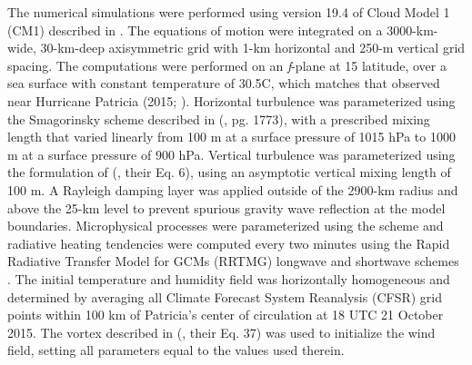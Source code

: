 \documentclass{ametsoc}
\begin{document}
The numerical simulations were performed using version 19.4 of Cloud Model 1 (CM1) described in \cite{BryanRotunno2009}.
The equations of motion were integrated on a 3000-km-wide, 30-km-deep axisymmetric grid with 1-km horizontal and 250-m vertical grid spacing.
The computations were performed on an \textit{f}-plane at 15 latitude, over a sea surface with constant temperature of 30.5\textdegree C, which matches that observed near Hurricane Patricia (2015; \citeauthor{Kimberlainetal2016} \citeyear{Kimberlainetal2016}).
Horizontal turbulence was parameterized using the Smagorinsky scheme described in \citeauthor{BryanRotunno2009} (\citeyear{BryanRotunno2009}, pg. 1773), with a prescribed mixing length that varied linearly from 100 m at a surface pressure of 1015 hPa to 1000 m at a surface pressure of 900 hPa.
Vertical turbulence was parameterized using the formulation of \citeauthor{MarkowskiBryan2016} (\citeyear{MarkowskiBryan2016}, their Eq. 6), using an asymptotic vertical mixing length of 100 m.
A Rayleigh damping layer was applied outside of the 2900-km radius and above the 25-km level to prevent spurious gravity wave reflection at the model boundaries.
Microphysical processes were parameterized using the \cite{Thompson} scheme and radiative heating tendencies were computed every two minutes using the Rapid Radiative Transfer Model for GCMs (RRTMG) longwave and shortwave schemes \citep{Iacono}.
The initial temperature and humidity field was horizontally homogeneous and determined by averaging all Climate Forecast System Reanalysis (CFSR) grid points within 100 km of Patricia's center of circulation at 18 UTC 21 October 2015.
The vortex described in \citeauthor{RotunnoEmanuel} (\citeyear{RotunnoEmanuel}, their Eq. 37) was used to initialize the wind field, setting all parameters equal to the values used therein.
\end{document}
